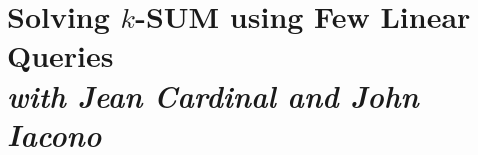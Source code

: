 \chapter%
[Solving \texorpdfstring{$k$-SUM}{k-SUM} using Few Linear Queries]%
{Solving $k$-SUM using Few Linear Queries\\[1ex]
\normalfont\footnotesize\itshape with Jean Cardinal and John Iacono}%
\label{paper:ksum-algorithm}



